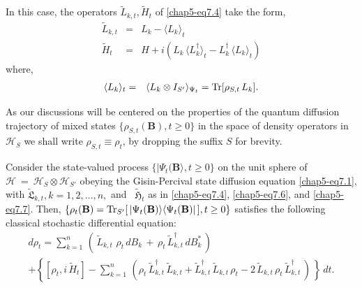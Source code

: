 In this case, the operators $\widetilde{L}_{k,t}, \widetilde{H}_t$ of \eqref{chap5-eq7.4} take the form,     
\begin{eqnarray}
\widetilde{L}_{k,t} &=&  L_k -\langle  L_k\rangle_{t}  \nonumber \\                    
\widetilde{H}_t&=& H  +i\left(L_k\, \langle L^\dag_k\rangle_{t}-L^\dag_k\, \langle L_k\rangle_{t} \right) \label{chap5-eq7.6}
\end{eqnarray}
where, 
\begin{eqnarray}
\langle  L_k\rangle_{t}&=&\langle L_k\otimes I_{S'} \rangle_{\Psi_t} = {\rm Tr}[\rho_{S,t}\, L_k].  \label{chap5-eq7.7}
\end{eqnarray} 

As our discussions will be centered on the properties of the quantum diffusion trajectory of  mixed states  $\{\rho_{S,t}(\mathbf{B}), t\geq 0\}$ in the space of density operators in $\mathcal{H}_S$  we shall write  $\rho_{S,t}\equiv \rho_{t}$, by dropping the suffix $S$ for brevity. 

\begin{prop*}
Consider the state-valued  process $\{\vert\Psi_t(\mathbf{B}\rangle, t\geq 0\}$ on the unit sphere of $\mathcal{H}~=~\mathcal{H}_S\otimes \mathcal{H}_{S'}$ obeying  the  Gisin-Percival state diffusion equation \eqref{chap5-eq7.1}, with $\widetilde{\mathfrak{L}}_{k,t}, k=1,2,\ldots, n,$ and \ $\widetilde{\mathfrak{H}}_t$ as in \eqref{chap5-eq7.4}, \eqref{chap5-eq7.6}, and \eqref{chap5-eq7.7}. Then, $\{\rho_t(\mathbf{B})={\rm Tr}_{S'}[\,\vert 
\Psi_t(\mathbf{B})\rangle\langle\Psi_t(\mathbf{B})\vert\,], t\geq 0\}$ satisfies the following classical stochastic differential equation:
\begin{multline}
d\rho_t = \sum_{k=1}^{n}\,\left(\,\widetilde{L}_{k,t}\,\, \rho_t\, dB_{k}\, + \, \rho_t\,\widetilde{L}^\dag_{k,t}\, dB^*_{k}\,\right)  \\ 
 +  \left\{ \left[\rho_t, i\, \widetilde{H}_{t}\right] - \sum_{k=1}^{n}\, \left( \rho_t\, \widetilde{L}^\dag_{k,t}\, \widetilde{L}_{k,t} + \widetilde{L}^{\dag}_{k,t}\, \widetilde{L}_{k,t}\, \rho_t - 2\, \widetilde{L}_{k,t}\, \rho_t\,\widetilde{L}^\dag_{k,t}\,\right)\,\right\}\, dt.  \label{chap5-eq7.8}
\end{multline}
\end{prop*}

